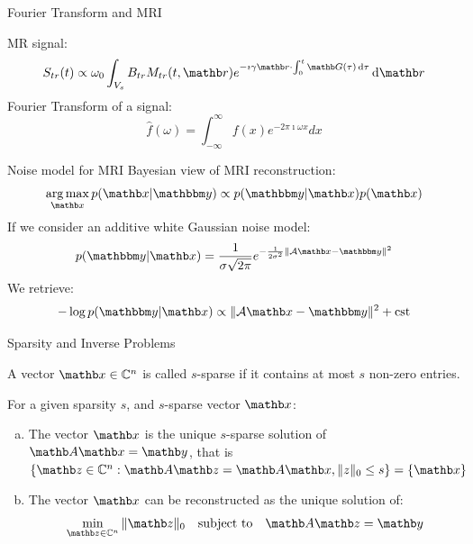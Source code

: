 \begin{frame}{Fourier Transform and MRI}
    \begin{multicols}{2}
        MR signal:
        \begin{equation*}
            \vspace{\baselineskip}
            S_{tr}(t) \propto \omega_0  \int_{V_s} B_{tr} M_{tr}(t, \rb) e^{-\imath \gamma \rb \cdot \int_0^t \Gb(\tau)  \dif \tau} \dif \rb
        \end{equation*}
        \newpage
        Fourier Transform of a signal:
        \begin{equation*}
            \hat{f}(\omega) = \int_{-\infty}^{\infty} f(x) e^{-2\pi \imath \omega x} dx
        \end{equation*}
    \end{multicols}
\end{frame}


\begin{frame}{Noise model for MRI}
    Bayesian view of MRI reconstruction:
    \begin{equation*}
        \argmax_{\xb} p(\xb|\ybb) \propto p(\ybb|\xb) p(\xb)
    \end{equation*}
    If we consider an additive white Gaussian noise model:
    \begin{equation*}
        p(\ybb|\xb) = \frac{1}{\sigma \sqrt{2\pi}} e^{-\frac{1}{2\sigma^2} \|\mathcal{A}\xb - \ybb \| ^2 }
    \end{equation*}
    We retrieve:
    \begin{equation*}
        - \log p(\ybb|\xb) \propto \|\mathcal{A}\xb - \ybb \| ^2 + \text{cst}
    \end{equation*}
\end{frame}

\begin{frame}{Sparsity and Inverse Problems}
    \begin{definition}[Sparsity]
        A vector $\xb \in \mathbb{C}^n$ is called $s$-sparse if it contains at most $s$ non-zero entries.
    \end{definition}

    \begin{lemma}
        For a given sparsity $s$, and $s$-sparse vector $\xb$:
    \begin{enumerate}[(a)]
        \item The vector $\xb$ is the unique $s$-sparse solution of $\Ab \xb = \yb$, that is $\{\zb \in \mathbb{C}^n : \Ab \zb = \Ab \xb, \|z\|_0 \leq s\} = \{\xb\}$
        \item The vector $\xb$ can be reconstructed as the unique solution of:
        \begin{equation*}
            \label{eq:cs-problem-l0-min}
            \min_{\zb \in \mathbb{C}^n} \|\zb\|_0 \quad \text{subject to} \quad \Ab \zb = \yb
        \end{equation*}
    \end{enumerate}
    \end{lemma}
\end{frame}

